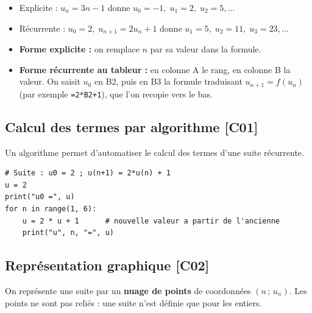 \documentclass[a4paper,11pt]{article}
\begin{document}
\begin{exemple}
\begin{itemize}
  \item Explicite : $u_n = 3n - 1$ donne $u_0 = -1,\; u_1 = 2,\; u_2 = 5,\dots$
  \item Récurrente : $u_0 = 2,\; u_{n+1} = 2u_n + 1$ donne $u_1 = 5,\; u_2 = 11,\; u_3 = 23,\dots$
\end{itemize}
\end{exemple}

\begin{methode}
\begin{itemize}
  \item \textbf{Forme explicite :} on remplace $n$ par sa valeur dans la formule.
  \item \textbf{Forme récurrente au tableur :} en colonne A le rang, en colonne B la valeur. On saisit $u_0$ en B2, puis en B3 la formule traduisant $u_{n+1} = f(u_n)$ (par exemple \texttt{=2*B2+1}), que l'on recopie vers le bas.
\end{itemize}
\end{methode}

\subsection{Calcul des termes par algorithme \hfill {\normalsize\color{uimmred}[C01]}}

Un algorithme permet d'automatiser le calcul des termes d'une suite récurrente.

\begin{lstlisting}[style=uimmpython, caption={Calcul des premiers termes d'une suite récurrente}]
# Suite : u0 = 2 ; u(n+1) = 2*u(n) + 1
u = 2
print("u0 =", u)
for n in range(1, 6):
    u = 2 * u + 1      # nouvelle valeur a partir de l'ancienne
    print("u", n, "=", u)
\end{lstlisting}

\subsection{Représentation graphique \hfill {\normalsize\color{uimmred}[C02]}}

\begin{definition}
On représente une suite par un \textbf{nuage de points} de coordonnées $(n\,;\,u_n)$. Les points ne sont pas reliés : une suite n'est définie que pour les entiers.
\end{definition}
\end{document}
